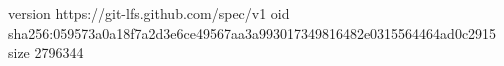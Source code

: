 version https://git-lfs.github.com/spec/v1
oid sha256:059573a0a18f7a2d3e6ce49567aa3a993017349816482e0315564464ad0c2915
size 2796344
